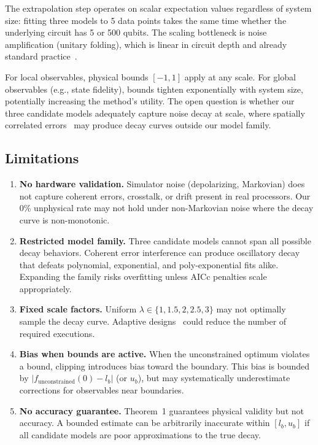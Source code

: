The extrapolation step operates on scalar expectation values regardless of system size: fitting three models to 5 data points takes the same time whether the underlying circuit has 5 or 500 qubits. The scaling bottleneck is noise amplification (unitary folding), which is linear in circuit depth and already standard practice~\cite{GiurgicaTiron2020}.

For local observables, physical bounds $[-1, 1]$ apply at any scale. For global observables (e.g., state fidelity), bounds tighten exponentially with system size, potentially increasing the method's utility. The open question is whether our three candidate models adequately capture noise decay at scale, where spatially correlated errors~\cite{vandenBerg2023} may produce decay curves outside our model family.

\subsection{Limitations}

\begin{enumerate}
    \item \textbf{No hardware validation.} Simulator noise (depolarizing, Markovian) does not capture coherent errors, crosstalk, or drift present in real processors. Our 0\% unphysical rate may not hold under non-Markovian noise where the decay curve is non-monotonic.

    \item \textbf{Restricted model family.} Three candidate models cannot span all possible decay behaviors. Coherent error interference can produce oscillatory decay that defeats polynomial, exponential, and poly-exponential fits alike. Expanding the family risks overfitting unless AICc penalties scale appropriately.

    \item \textbf{Fixed scale factors.} Uniform $\lambda \in \{1, 1.5, 2, 2.5, 3\}$ may not optimally sample the decay curve. Adaptive designs~\cite{GiurgicaTiron2020} could reduce the number of required executions.

    \item \textbf{Bias when bounds are active.} When the unconstrained optimum violates a bound, clipping introduces bias toward the boundary. This bias is bounded by $|f_\text{unconstrained}(0) - l_b|$ (or $u_b$), but may systematically underestimate corrections for observables near boundaries.

    \item \textbf{No accuracy guarantee.} Theorem~1 guarantees physical validity but not accuracy. A bounded estimate can be arbitrarily inaccurate within $[l_b, u_b]$ if all candidate models are poor approximations to the true decay.
\end{enumerate}

